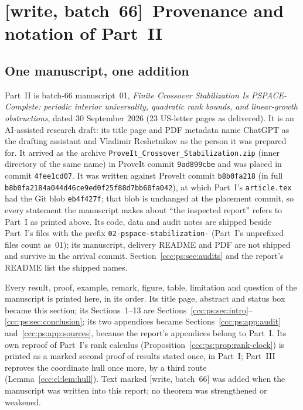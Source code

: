 \documentclass[11pt,letterpaper]{article}
\theoremstyle{definition}
\theoremstyle{remark}
\newcommand{\wsix}{\textup{[write, batch~66]}}
\begin{document}
\section{\texorpdfstring{\wsix\ }{}Provenance and notation of Part~II}
\label{ccc:ps:sec:provenance}

\subsection{One manuscript, one addition}\label{ccc:ps:sec:source}

Part~II is batch-66 manuscript~01, \emph{Finite Crossover Stabilization Is
PSPACE-Complete: periodic interior universality, quadratic rank bounds, and
linear-growth obstructions}, dated 30 September 2026 (23 US-letter pages as
delivered). It is an AI-assisted research draft: its title page and PDF
metadata name ChatGPT as the drafting assistant and Vladimir Reshetnikov as
the person it was prepared for. It arrived as the archive
\texttt{ProveIt\_Crossover\_Stabilization.zip} (inner directory of the same
name) in ProveIt commit \texttt{9ad899cbe} and was placed in commit
\texttt{4fee1cd07}. It was written against ProveIt commit \texttt{b8b0fa218}
(in full \nolinkurl{b8b0fa2184a044d46ce9ed0f25f88d7bb60fa042}), at which
Part~I's \texttt{article.tex} had the Git blob \texttt{eb4f427f}; that blob is
unchanged at the placement commit, so every statement the manuscript makes
about ``the inspected report'' refers to Part~I as printed above. Its code,
data and audit notes are shipped beside Part~I's files with the prefix
\nolinkurl{02-pspace-stabilization-} (Part~I's unprefixed files count
as~01); its manuscript, delivery README and PDF are not shipped and survive
in the arrival commit. Section~\ref{ccc:ps:sec:audits} and the report's
README list the shipped names.

Every result, proof, example, remark, figure, table, limitation and question
of the manuscript is printed here, in its order. Its title page, abstract
and status box became this section; its Sections~1--13 are
Sections~\ref{ccc:ps:sec:intro}--\ref{ccc:ps:sec:conclusion}; its two
appendices became Sections~\ref{ccc:ps:app:audit} and~\ref{ccc:ps:app:sources},
because the report's appendices belong to Part~I. Its own reproof of Part~I's
rank calculus (Proposition~\ref{ccc:ps:prop:rank-clock}) is printed as a
marked second proof of results stated once, in Part~I; Part~III reproves the
coordinate hull once more, by a third route
(Lemma~\ref{ccc:cl:lem:hull}). Text marked \wsix{} was added when the
manuscript was written into this report; no theorem was strengthened or
weakened.
\end{document}
